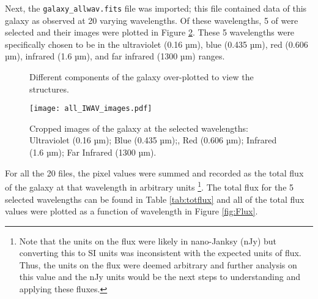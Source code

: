 \documentclass[10pt, preprint]{aastex}
\begin{document}
Next, the \texttt{galaxy\_allwav.fits} file was imported; this file contained data of this galaxy as observed at 20 varying wavelengths. Of these wavelengths, 5 of were selected and their images were plotted in Figure \ref{fig:wavelenghtimgs}. These 5 wavelengths were specifically chosen to be in the ultraviolet (0.16 µm), blue (0.435 µm), red (0.606 µm), infrared (1.6 µm), and far infrared (1300 µm) ranges. 

\begin{figure}[H]
    \centering
    \caption{Different components of the galaxy over-plotted to view the structures.}
    \label{fig:contours}
\end{figure}

\vspace{-2\baselineskip}

\begin{figure}[H]
    \centering
    \texttt{[image: all\_IWAV\_images.pdf]}
    \vspace{-3\baselineskip}
    \caption{Cropped images of the galaxy at the selected wavelengths: Ultraviolet (0.16 µm); Blue (0.435 µm);, Red (0.606 µm); Infrared (1.6 µm); Far Infrared (1300 µm).}
    \label{fig:wavelenghtimgs}
\end{figure}

For all the 20 files, the pixel values were summed and recorded as the total flux of the galaxy at that wavelength in arbitrary units \footnote{Note that the units on the flux were likely in nano-Janksy (nJy) but converting this to SI units was inconsistent with the expected units of flux. Thus, the units on the flux were deemed arbitrary and further analysis on this value and the nJy units would be the next steps to understanding and applying these fluxes.}. The total flux for the 5 selected wavelengths can be found in Table \ref{tab:totflux} and all of the total flux values were plotted as a function of wavelength in Figure \ref{fig:Flux}.
\end{document}
